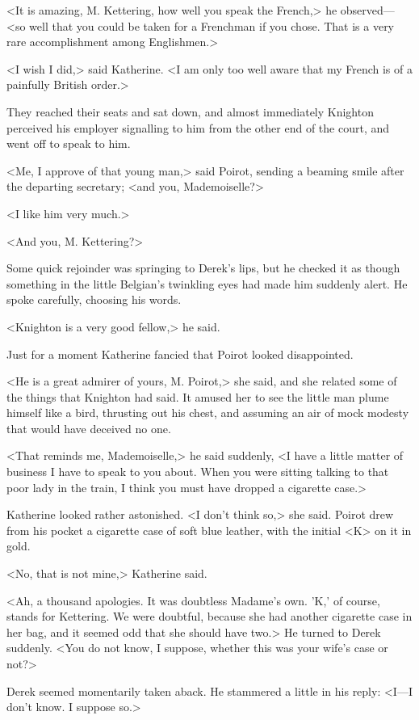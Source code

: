 <It is amazing, M. Kettering, how well you speak the French,> he observed—<so well that you could be taken for a Frenchman if you chose. That is a very rare accomplishment among Englishmen.>

<I wish I did,> said Katherine. <I am only too well aware that my French is of a painfully British order.>

They reached their seats and sat down, and almost immediately Knighton perceived his employer signalling to him from the other end of the court, and went off to speak to him.

<Me, I approve of that young man,> said Poirot, sending a beaming smile after the departing secretary; <and you, Mademoiselle?>

<I like him very much.>

<And you, M. Kettering?>

Some quick rejoinder was springing to Derek's lips, but he checked it as though something in the little Belgian's twinkling eyes had made him suddenly alert. He spoke carefully, choosing his words.

<Knighton is a very good fellow,> he said.

Just for a moment Katherine fancied that Poirot looked disappointed.

<He is a great admirer of yours, M. Poirot,> she said, and she related some of the things that Knighton had said. It amused her to see the little man plume himself like a bird, thrusting out his chest, and assuming an air of mock modesty that would have deceived no one.

<That reminds me, Mademoiselle,> he said suddenly, <I have a little matter of business I have to speak to you about. When you were sitting talking to that poor lady in the train, I think you must have dropped a cigarette case.>

Katherine looked rather astonished. <I don't think so,> she said. Poirot drew from his pocket a cigarette case of soft blue leather, with the initial <K> on it in gold.

<No, that is not mine,> Katherine said.

<Ah, a thousand apologies. It was doubtless Madame's own. 'K,' of course, stands for Kettering. We were doubtful, because she had another cigarette case in her bag, and it seemed odd that she should have two.> He turned to Derek suddenly. <You do not know, I suppose, whether this was your wife's case or not?>

Derek seemed momentarily taken aback. He stammered a little in his reply: <I—I don't know. I suppose so.>

